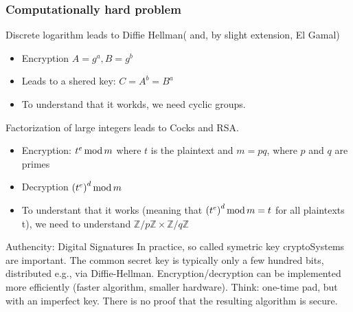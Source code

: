 \subsubsection{Computationally hard problem}
\begin{parag}{Discrete logarithm}
    leads to Diffie Hellman( and, by slight extension, El Gamal)\\
    \begin{itemize}
        \item Encryption $A = g^a, B = g^b$
        \item Leads to a shered key: $C = A^b = B^a$
        \item To understand that it workds, we need cyclic groups.
    \end{itemize}
    
\end{parag}
\begin{parag}{Factorization of large integers}
    leads to Cocks and RSA.\\
    \begin{itemize}
        \item Encryption: $t^e \operatorname{mod} m$ where $t$ is the plaintext and $m = pq$, where $p$ and $q$ are primes
        \item Decryption $\left(t^e\right)^d \Mod m$
        \item To understant that it works (meaning that $\left(t^e\right)^d \Mod m = t$ for all plaintexts t), we need to understand $ \mathbb{Z} / p \mathbb{Z} \times \mathbb{Z} / q \mathbb{Z}$
        
    \end{itemize}
    
    
\end{parag}
\begin{parag}{Authencity: Digital Signatures}
    In practice, so called symetric key cryptoSystems are important. The common secret key is typically only a few hundred bits, distributed e.g., via Diffie-Hellman. Encryption/decryption can be implemented more efficiently (faster  algorithm, smaller hardware). Think: one-time pad, but with an imperfect key. There is no proof that the resulting algorithm is secure.
    
\end{parag}






